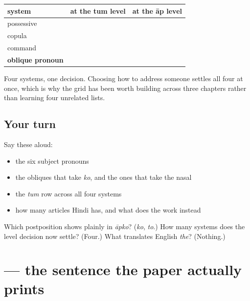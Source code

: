 \begin{grammarlens}[title={Grammar Lens: the fourth appearance of one decision}]
\noindent
\begin{tabularx}{\linewidth}{@{}>{\raggedright\arraybackslash}X>{\raggedright\arraybackslash}X>{\raggedright\arraybackslash}X@{}}
\toprule
\textbf{system} & \textbf{at the tum level} & \textbf{at the āp level} \\
\midrule
possessive & \hi{तुम्हारा} & \hi{आपका} \\
copula & \hi{हो} & \hi{हैं} \\
command & \hi{बोलो} & \hi{बोलिए} \\
\textbf{oblique pronoun} & \textbf{\hi{तुम्हें}} & \textbf{\hi{आपको}} \\
\bottomrule
\end{tabularx}

Four systems, one decision. Choosing how to address someone settles all four at once, which is why the grid has been worth building across three chapters rather than learning four unrelated lists.
\end{grammarlens}

\subsection*{Your turn}
Say these aloud:

\begin{itemize}
\raggedright
  \item the six subject pronouns
  \item the obliques that take \emph{ko}, and the ones that take the nasal
  \item the \emph{tum} row across all four systems
  \item how many articles Hindi has, and what does the work instead
\end{itemize}

\begin{tcolorbox}[breakable,colback=teal!4,colframe=teal!35!black,title={Before you move on}]
Which postposition shows plainly in \emph{āpko}? (\emph{ko}, \emph{to}.) How many systems does the level decision now settle? (Four.) What translates English \emph{the}? (Nothing.)
\end{tcolorbox}
\section[\texorpdfstring{\hi{हम} \hi{स्टेशन} \hi{पर} \hi{मिलेंगे} (ham sṭeśan par milẽge)}{हम स्टेशन पर मिलेंगे (ham sṭeśan par milẽge)}]{    — the sentence the paper actually prints}

